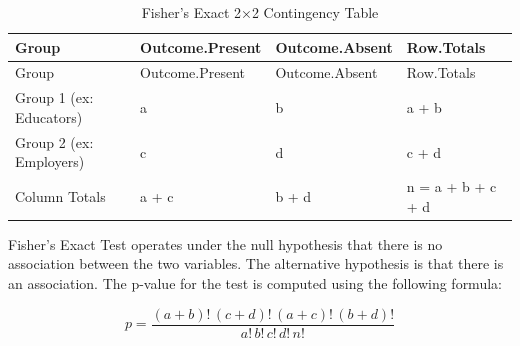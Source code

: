 \documentclass[
  12pt,
  letterpaper,
  DIV=11,
  numbers=noendperiod]{scrartcl}
\numberwithin{figure}{section}
\numberwithin{table}{section}
\begin{document}
\begin{longtable}[]{@{}
  >{\raggedright\arraybackslash}p{}
  >{\raggedleft\arraybackslash}p{}
  >{\raggedleft\arraybackslash}p{}
  >{\raggedright\arraybackslash}p{}@{}}
\caption{Fisher's Exact 2×2 Contingency Table}\tabularnewline
\toprule\noalign{}
\begin{minipage}[b]{\linewidth}\raggedright
Group
\end{minipage} & \begin{minipage}[b]{\linewidth}\raggedleft
Outcome.Present
\end{minipage} & \begin{minipage}[b]{\linewidth}\raggedleft
Outcome.Absent
\end{minipage} & \begin{minipage}[b]{\linewidth}\raggedright
Row.Totals
\end{minipage} \\
\midrule\noalign{}
\endfirsthead
\toprule\noalign{}
\begin{minipage}[b]{\linewidth}\raggedright
Group
\end{minipage} & \begin{minipage}[b]{\linewidth}\raggedleft
Outcome.Present
\end{minipage} & \begin{minipage}[b]{\linewidth}\raggedleft
Outcome.Absent
\end{minipage} & \begin{minipage}[b]{\linewidth}\raggedright
Row.Totals
\end{minipage} \\
\midrule\noalign{}
\endhead
\bottomrule\noalign{}
\endlastfoot
Group 1 (ex: Educators) & a & b & a + b \\
Group 2 (ex: Employers) & c & d & c + d \\
Column Totals & a + c & b + d & n = a + b + c + d \\
\end{longtable}

Fisher's Exact Test operates under the null hypothesis that there is no
association between the two variables. The alternative hypothesis is
that there is an association. The p-value for the test is computed using
the following formula:

\[p = \frac{(a+b)! \, (c+d)! \, (a+c)! \, (b+d)!}{a! \, b! \, c! \, d! \, n!}\]
\end{document}
